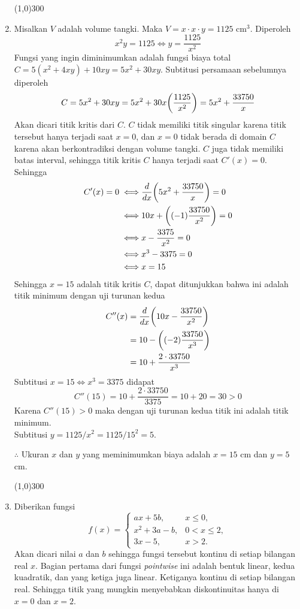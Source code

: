 \begin{enumerate}[leftmargin=*, label={\arabic*}.]
\begin{center}
    \line(1,0){300}
\end{center}
\item Misalkan $V$ adalah volume tangki. Maka $V = x \cdot x \cdot y = 1125$ cm$^{3}$.
Diperoleh
\[
x^{2}y = 1125 \iff y = \frac{1125}{x^{2}}
\]
Fungsi yang ingin diminimumkan adalah fungsi biaya total 
$C = 5(x^{2}+4xy)+10xy=5x^{2}+30xy$. Subtitusi persamaan sebelumnya diperoleh
\[
C = 5x^{2}+30xy = 5x^{2}+30x\bracket*{\frac{1125}{x^{2}}} = 5x^{2}+\frac{33750}{x}
\]
Akan dicari titik kritis dari $C$. $C$ tidak memiliki titik singular karena titik 
tersebut hanya terjadi saat $x = 0$, dan $x=0$ tidak berada di domain $C$ karena akan 
berkontradiksi dengan volume tangki. $C$ juga tidak memiliki batas interval, sehingga titik 
kritis $C$ hanya terjadi saat $C'(x)=0$.
Sehingga
\begin{align*}
    C'(x) = 0 \iff &\drv{x}{5x^{2}+\frac{33750}{x}} = 0\\
    \iff & 10x+\bracket*{(-1)\frac{33750}{x^{2}}} = 0\\
    \iff &x-\frac{3375}{x^{2}} = 0\\
    \iff &x^{3}-3375=0\\
    \iff &x = 15
\end{align*}
Sehingga $x=15$ adalah titik kritis $C$, dapat ditunjukkan bahwa ini adalah titik minimum 
dengan uji turunan kedua
\begin{align*}
    C''(x) &= \drv{x}{10x-\frac{33750}{x^{2}}}\\
    &= 10 - \bracket*{(-2)\frac{33750}{x^{3}}}\\
    &= 10 + \frac{2\cdot 33750}{x^{3}}
\end{align*}
Subtitusi $x=15 \iff x^{3} = 3375$ didapat
\[
C''(15) = 10+\frac{2\cdot 33750}{3375} = 10 + 20 = 30 > 0
\]
Karena $C''(15)>0$ maka dengan uji turunan kedua titik ini adalah titik minimum.\\
Subtitusi $y = 1125/x^{2} = 1125/15^{2} = 5$.

$\therefore$ Ukuran $x$ dan $y$ yang meminimumkan biaya adalah $x=15$ cm dan $y=5$ cm.
\begin{center}
    \line(1,0){300}
\end{center}

\item Diberikan fungsi
\[
    f(x)=
    \begin{cases}
        ax+5b, &x \leq 0,\\
        x^2+3a-b, &0 < x \leq 2,\\
        3x-5, &x > 2.
    \end{cases}
\]
Akan dicari nilai $a$ dan $b$ sehingga fungsi tersebut kontinu di setiap bilangan real $x$.
Bagian pertama dari fungsi \textit{pointwise} ini adalah bentuk linear, kedua kuadratik, 
dan yang ketiga juga linear. Ketiganya kontinu di setiap bilangan real. 
Sehingga titik yang mungkin menyebabkan diskontinuitas hanya di $x=0$ dan $x=2$.


\end{enumerate}
